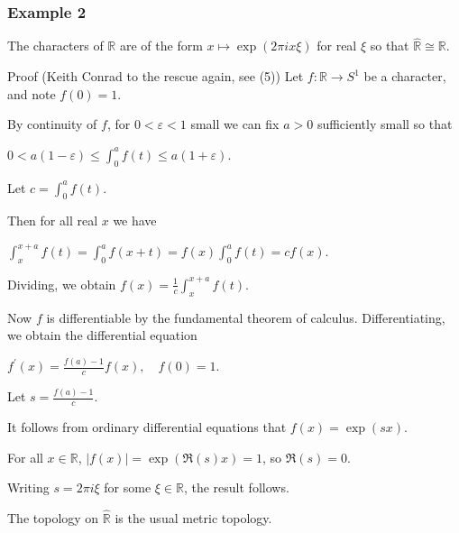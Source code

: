 \documentclass[mathserif
]{beamer}
\begin{document}
\begin{frame}
    \frametitle{Example 2}
The characters of $\mathbb{R}$ are of the form $x\mapsto \exp(2\pi i x\xi)$ for real $\xi$ so that $\widehat{\mathbb{R}}\cong\mathbb{R}$.
\pause 
\begin{block}{Proof (Keith Conrad to the rescue again, see (5))} %
    Let $f \colon \mathbb{R}\to S^1$ be a character, and note $f(0) = 1$.\pause 

    By continuity of $f$, for $0<\varepsilon<1$ small we can fix $a>0$ sufficiently small so that \begin{center}
        $0<a(1-\varepsilon)\leq \int_0^a f(t)\leq a(1+\varepsilon)$.
    \end{center} Let $c = \int_0^a f(t)$.
\end{block}
\end{frame}

\begin{frame}
    \begin{block}{}
        Then for all real $x$ we have \begin{center}
            $\int_x^{x+a}f(t) = \int_0^a f(x+t) = f(x)\int_0^a f(t) = cf(x)$.
        \end{center} \pause 
        Dividing, we obtain $f(x) = \frac{1}{c}\int_x^{x+a}f(t)$. \pause

        Now $f$ is differentiable by the fundamental theorem of calculus. Differentiating, we obtain the differential equation \begin{center}
            $f^\prime(x) = \frac{f(a)-1}{c} f(x),\quad f(0) = 1$.
        \end{center} Let $s = \frac{f(a)-1}{c}$. \pause 

        It follows from ordinary differential equations that $f(x) = \exp(sx)$. \pause 

        For all $x\in \mathbb{R}$, $|f(x)|= \exp(\Re(s) x)=1$, so $\Re( s) = 0$. \pause 

        Writing $s = 2\pi i \xi$ for some $\xi\in \mathbb{R}$, the result follows. \pushQED{\qed}\qedhere\popQED
    \end{block} \pause The topology on $\widehat{\mathbb{R}}$ is the usual metric topology.
\end{frame}
\end{document}
